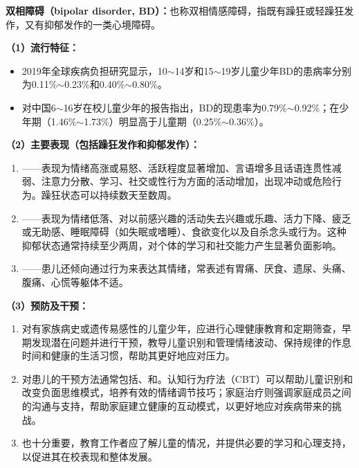 \begin{keybox}
\textbf{双相障碍（bipolar disorder, BD）：}也称双相情感障碍，指既有躁狂或轻躁狂发作，又有抑郁发作的一类心境障碍。

\vspace{4pt}
\textbf{（1）流行特征：}

\begin{itemize}[leftmargin=*]
    \item 2019年全球疾病负担研究显示，10$\sim$14岁和15$\sim$19岁儿童少年BD的患病率分别为0.11\%$\sim$0.23\%和0.40\%$\sim$0.80\%。
    \item 对中国6$\sim$16岁在校儿童少年的报告指出，BD的现患率为0.79\%$\sim$0.92\%；在少年期（1.46\%$\sim$1.73\%）明显高于儿童期（0.25\%$\sim$0.36\%）。
\end{itemize}

\vspace{4pt}
\textbf{（2）主要表现（包括躁狂发作和抑郁发作）：}

\begin{enumerate}[leftmargin=*]
    \item {}——表现为情绪高涨或易怒、活跃程度显著增加、言语增多且话语连贯性减弱、注意力分散、学习、社交或性行为方面的活动增加，出现冲动或危险行为。躁狂状态可以持续数天至数周。

    \item {}——表现为情绪低落、对以前感兴趣的活动失去兴趣或乐趣、活力下降、疲乏或无助感、睡眠障碍（如失眠或嗜睡）、食欲变化以及自杀念头或行为。这种抑郁状态通常持续至少两周，对个体的学习和社交能力产生显著负面影响。

    \item {}——患儿还倾向通过行为来表达其情绪，常表述有胃痛、厌食、遗尿、头痛、腹痛、心慌等躯体不适。
\end{enumerate}

\vspace{4pt}
\textbf{（3）预防及干预：}

\begin{enumerate}[leftmargin=*]
    \item 对有家族病史或遗传易感性的儿童少年，应进行心理健康教育和定期筛查，早期发现潜在问题并进行干预，教导儿童识别和管理情绪波动、保持规律的作息时间和健康的生活习惯，帮助其更好地应对压力。
    \item 对患儿的干预方法通常包括、和。认知行为疗法（CBT）可以帮助儿童识别和改变负面思维模式，培养有效的情绪调节技巧；家庭治疗则强调家庭成员之间的沟通与支持，帮助家庭建立健康的互动模式，以更好地应对疾病带来的挑战。
    \item {}也十分重要，教育工作者应了解儿童的情况，并提供必要的学习和心理支持，以促进其在校表现和整体发展。
\end{enumerate}
\end{keybox}

